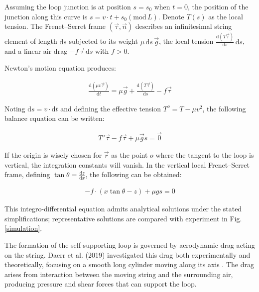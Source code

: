 Assuming the loop junction is at position $s = s_0$ when $t = 0$, the position of the junction along this curve is $s = v \cdot t + s_0 (\mathrm{mod} \, L)$. Denote $T(s)$ as the local tension. The Frenet--Serret frame $(\vec{\tau},\vec{n})$ describes an infinitesimal string element of length $\mathrm{d}s$ subjected to its weight $\mu\,\mathrm{d}s\,\vec{g}$, the local tension $\frac{\mathrm{d}(T\vec{\tau})}{\mathrm{d}s}\,\mathrm{d}s$, and a linear air drag $-f\,\vec{\tau}\,\mathrm{d}s$ with $f>0$.

Newton's motion equation produces:

\vspace{-0.3cm}
\begin{equation}
\begin{split}
\frac{\mathrm{d}(\mu v \vec{\tau})}{\mathrm{d}t} = \mu \vec{g} + \frac{\mathrm{d}(T \vec{\tau})}{\mathrm{d}s} - f \vec{\tau}
\end{split}
\end{equation}

Noting $\mathrm{d}s = v \cdot \mathrm{d}t$ and defining the effective tension $T^o = T-\mu v^2$, the following balance equation can be written:

\vspace{-0.3cm}
\begin{equation}
\begin{split}
T^o \vec{\tau} - f \vec{\tau} +\mu \vec{g}s=\vec{0}
\end{split}
\end{equation}

If the origin is wisely chosen for $\vec{r}$ as the point $o$ where the tangent to the loop is vertical, the integration constants will vanish. In the vertical local Frenet--Serret frame, defining $\tan\theta = \frac{\mathrm{d}z}{\mathrm{d}x}$, the following can be obtained:

\vspace{-0.3cm}
\begin{equation}
\begin{split}
-f \cdot ( x \tan \theta - z )+\mu gs=0
\end{split}
\end{equation}

This integro-differential equation admits analytical solutions under the stated simplifications; representative solutions are compared with experiment in Fig. \ref{simulation}.

The formation of the self-supporting loop is governed by aerodynamic drag acting on the string. Daerr et al. (2019) investigated this drag both experimentally and theoretically, focusing on a smooth long cylinder moving along its axis \cite{daerr2019charmed}. The drag arises from interaction between the moving string and the surrounding air, producing pressure and shear forces that can support the loop.

